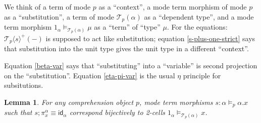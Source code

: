 \documentclass[10pt]{article}
\newtheorem{lemma}{Lemma}
\theoremstyle{definition}
\newcommand{\Yields}{\vDash}
\newcommand{\id}{\mathsf{id}}
\newcommand\TrPlus[2]{\ensuremath{{#1}^+(#2)}}
\newcommand\El[2]{\mathcal{T}_{#1}(#2)}
\newcommand\ApEl[2]{\mathcal{T}_{#1}\langle#2\rangle}
\begin{document}
We think of a term of mode $p$ as a ``context'', a mode term morphism of
mode $p$ as a ``substitution'', a term of mode $\El{p}{\alpha}$ as a
``dependent type'', and a mode term morphism $1_\alpha
\Yields_{\El{p}{\alpha}} \mu$ as a ``term'' of ``type'' $\mu$.  For the
equations: $\TrPlus{\ApEl{p}{s}}{-}$ is supposed to act like
substitution; equation \eqref{s-plus-one-strict} says that substitution
into the unit type gives the unit type in a different ``context''.

Equation \eqref{beta-var} says that ``substituting'' into a ``variable'' is second projection on the ``substitution''.  Equation \eqref{eta-pi-var} is the usual $\eta$ principle for subsitutions.

\begin{lemma}\label{sigma:total-to-fiber0} 
For any comprehension object $p$, mode term morphisms $s : \alpha \vDash_p \alpha.x$ such that $s;\pi^\alpha_x \equiv \id_\alpha$ correspond bijectively to 2-cells $1_\alpha \vDash_{\El{p}{\alpha}} x$.
\end{lemma}
\end{document}
